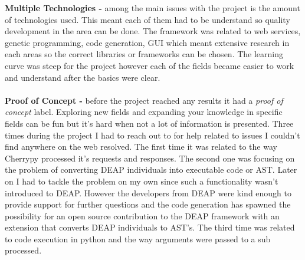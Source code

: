 \textbf{Multiple Technologies -} among the main issues with the project is the amount of technologies used. This meant each of them
had to be understand so quality development in the area can be done. The framework was related to web services, genetic programming,
code generation, GUI which meant extensive research in each areas so the correct libraries or frameworks can be chosen. The learning
curve was steep for the project however each of the fields became easier to work and understand after the basics were clear.
\paragraph{}
\textbf{Proof of Concept -} before the project reached any results it had a \textit{proof of concept} label. Exploring new fields and
expanding your knowledge in specific fields can be fun but it's hard when not a lot of information is presented. Three times during the
project I had to reach out to  for help related to issues I couldn't find anywhere on the web resolved. The first
time it was related to the way Cherrypy processed it's requests and responses. The second one was focusing on the problem of converting
DEAP individuals into executable code or AST. Later on I had to tackle the problem on my own since such a functionality wasn't introduced to DEAP.
However the developers from DEAP were kind enough to provide support for further questions and the code generation has spawned the possibility
for an open source contribution to the DEAP framework with an extension that converts DEAP individuals to AST's. The third time was related
to code execution in python and the way arguments were passed to a sub processed.